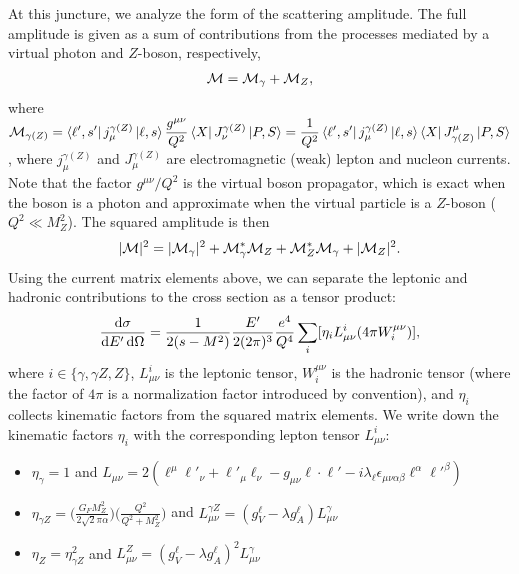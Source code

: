 \documentclass[aps,prd,amsmath,superscriptaddress,floatfix,nofootinbib]{revtex4-2}
\newcommand{\diff}[1]{{\rm d} #1}
\begin{document}
At this juncture, we analyze the form of the scattering amplitude.
The full amplitude is given as a sum of contributions from the processes mediated by a virtual photon and $Z$-boson, respectively,
\begin{eqnarray}
    \label{eq:DIS-amp}
    {\cal M} = {\cal M}_{\gamma} + {\cal M}_{Z}
,\end{eqnarray}
where $\displaystyle {\cal M}_{\gamma(Z)} = \bra{\ell',s'} j_{\mu}^{\gamma(Z)} \ket{\ell,s} \frac{g^{\mu\nu}}{Q^2} \bra{X} J_{\nu}^{\gamma(Z)} \ket{P,S} = \frac{1}{Q^2} \bra{\ell',s'} j_{\mu}^{\gamma(Z)} \ket{\ell,s} \bra{X} J^{\mu}_{\gamma(Z)} \ket{P,S}$, where $j_{\mu}^{\gamma(Z)}$ and $J_{\mu}^{\gamma(Z)}$ are electromagnetic (weak) lepton and nucleon currents.
Note that the factor $g^{\mu\nu}/Q^2$ is the virtual boson propagator, which is exact when the boson is a photon and approximate when the virtual particle is a $Z$-boson ($Q^2 \ll M_{Z}^2$).
The squared amplitude is then
\begin{eqnarray}
    \label{eq:DIS-sq-amp}
    |{\cal M}|^2 = |{\cal M}_{\gamma}|^2 + {\cal M}_{\gamma}^{*}{\cal M}_{Z} + {\cal M}_{Z}^{*}{\cal M}_{\gamma} + |{\cal M}_{Z}|^2
.\end{eqnarray}
Using the current matrix elements above, we can separate the leptonic and hadronic contributions to the cross section as a tensor product:
\begin{eqnarray}
    \label{eq:xsec-lep-had-tensors}
    \frac{\diff \sigma}{\diff E' \, \diff \Omega} = \frac{1}{2(s-M^2)} \frac{E'}{2(2\pi)^3} \frac{e^4}{Q^{4}} \sum_{i} [\eta_{i} L_{\mu\nu}^{i} (4\pi W^{\mu\nu}_{i})]
,\end{eqnarray}
where $i \in \{ \gamma, \gamma Z, Z \}$, $L_{\mu\nu}^{i}$ is the leptonic tensor, $W^{\mu\nu}_{i}$ is the hadronic tensor (where the factor of $4\pi$ is a normalization factor introduced by convention), and $\eta_{i}$ collects kinematic factors from the squared matrix elements.
We write down the kinematic factors $\eta_{i}$ with the corresponding lepton tensor $L_{\mu\nu}^{i}$:
\begin{itemize}
    \item $\eta_{\gamma} = 1$ and $L_{\mu\nu} = 2(\ell^{\mu} \ell'_{\nu} + \ell'_{\mu} \ell_{\nu} - g_{\mu\nu} \ell \cdot \ell' - i \lambda_{\ell} \epsilon_{\mu\nu\alpha\beta} \ell^{\alpha}\ell'^{\beta})$
    \item $\displaystyle \eta_{\gamma Z} = \Big( \frac{G_{F}M_{Z}^2}{2\sqrt{2} \pi \alpha} \Big) \Big( \frac{Q^2}{Q^2 + M_{Z}^2} \Big)$ and $L_{\mu\nu}^{\gamma Z} = (g_{V}^{\ell} - \lambda g_{A}^{\ell})L_{\mu\nu}^{\gamma}$
    \item $\eta_{Z} = \eta_{\gamma Z}^2$ and $L_{\mu\nu}^{Z} = (g_{V}^{\ell} - \lambda g_{A}^{\ell})^2 L_{\mu\nu}^{\gamma}$
\end{itemize}
\end{document}
